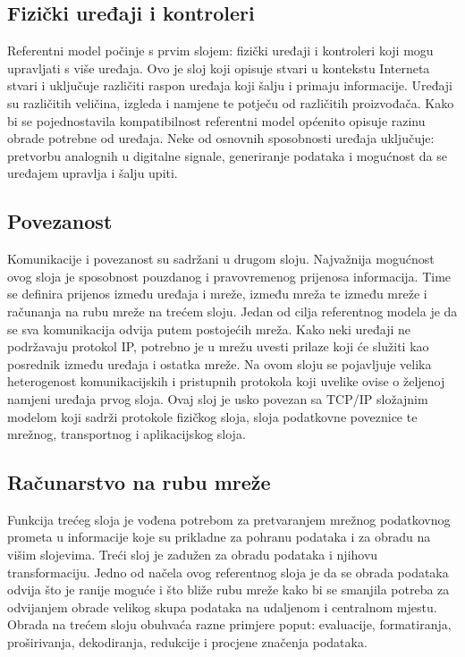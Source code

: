 \documentclass[times, utf8, diplomski]{fer}
\begin{document}
\subsection{Fizički uređaji i kontroleri}
Referentni model počinje s prvim slojem: fizički uređaji i kontroleri koji mogu upravljati s više uređaja. Ovo je sloj koji opisuje stvari u kontekstu Interneta stvari i uključuje različiti raspon uređaja koji šalju i primaju informacije. Uređaji 
su različitih veličina, izgleda i namjene te potječu od različitih proizvođača. Kako bi se pojednostavila kompatibilnost referentni model općenito opisuje razinu obrade potrebne od uređaja. Neke od osnovnih sposobnosti uređaja uključuje: pretvorbu analognih u digitalne signale, generiranje podataka i mogućnost da se uređajem upravlja i šalju upiti.

\subsection{Povezanost}
Komunikacije i povezanost su sadržani u drugom sloju. Najvažnija mogućnost ovog sloja je sposobnost pouzdanog i pravovremenog prijenosa informacija. Time se definira prijenos između uređaja i mreže, između mreža te između mreže i računanja na rubu mreže  na trećem sloju. Jedan od cilja referentnog modela je da se sva komunikacija odvija putem postojećih mreža. Kako neki uređaji ne podržavaju protokol IP, potrebno je u mrežu uvesti prilaze  koji će služiti kao posrednik između uređaja i ostatka mreže. Na ovom sloju se pojavljuje velika heterogenost komunikacijskih i pristupnih protokola koji uvelike ovise o željenoj namjeni uređaja prvog sloja. Ovaj sloj je usko povezan sa TCP/IP složajnim modelom koji sadrži protokole fizičkog sloja, sloja podatkovne poveznice te mrežnog, transportnog i aplikacijskog sloja.

\subsection{Računarstvo na rubu mreže}
Funkcija trećeg sloja je vođena potrebom za pretvaranjem mrežnog podatkovnog prometa u informacije koje su prikladne za pohranu podataka i za obradu na višim slojevima. Treći sloj je zadužen za obradu podataka i njihovu transformaciju. Jedno od načela ovog referentnog sloja je da se obrada podataka odvija što je ranije moguće i što bliže rubu mreže kako bi se smanjila potreba za odvijanjem obrade velikog skupa podataka na udaljenom i centralnom mjestu. Obrada na trećem sloju obuhvaća razne primjere poput: evaluacije, formatiranja, proširivanja, dekodiranja, redukcije i procjene značenja podataka.
\end{document}
